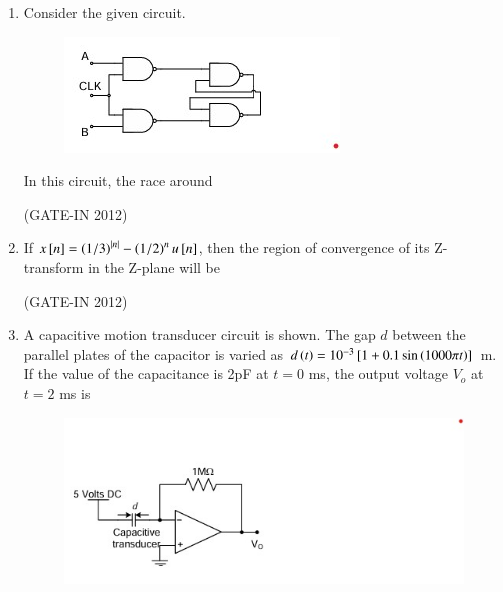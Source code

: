\documentclass[journal,12pt,onecolumn]{IEEEtran}
\theoremstyle{remark}
\begin{document}
\begin{enumerate}
\item Consider the given circuit.
\begin{figure}[H]
    \centering
    \includegraphics[width=0.6\columnwidth]{figs/a5.jpg}
    \caption*{}
    \label{fig:q14}
\end{figure}
In this circuit, the race around

\hfill{(GATE-IN 2012)}
\begin{enumerate}
\end{enumerate}

\item If $x{}\left[n\right]=\left(1/3\right)^{\left\vert n\right\vert} - \left(1/2\right)^n u{}\left[n\right]$, then the region of convergence  of its Z-transform in the Z-plane will be

\hfill{(GATE-IN 2012)}
\begin{enumerate}
\end{enumerate}

\item A capacitive motion transducer circuit is shown. The gap $d$ between the parallel plates of the capacitor is varied as $d\left(t\right)=10^{-3}{}\left[1+0.1\sin\left(1000\pi t\right)\right]$ m. If the value of the capacitance is 2pF at $t=0$ ms, the output voltage $V_o$ at $t=2$ ms is
\begin{figure}[H]
    \centering
    \includegraphics[width=0.5\columnwidth]{figs/a6.jpg}
    \caption*{}
    \label{fig:a6}
\end{figure}


\end{enumerate}
\end{document}
